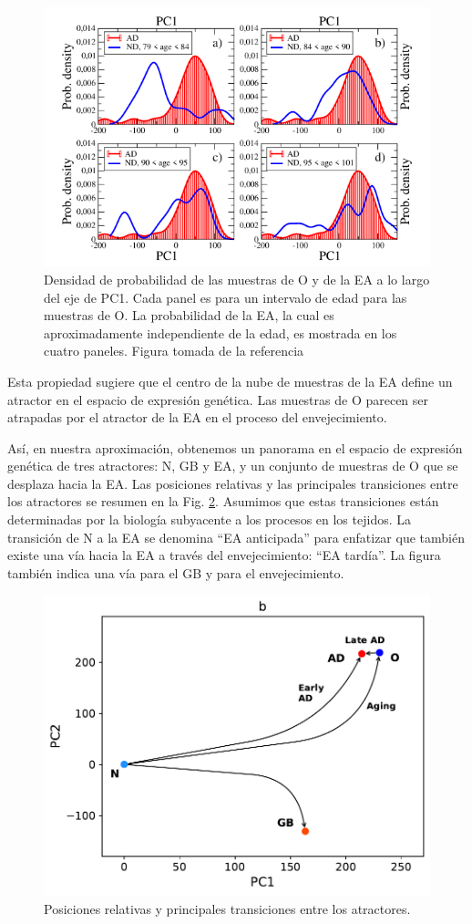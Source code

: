\begin{figure}[!htb]
	\centering
	\includegraphics[width=0.75\linewidth]{figures/suppl_otoad.png}
	\caption{Densidad de probabilidad de las muestras de O y de la EA a lo largo del eje de PC1. Cada panel es para un intervalo de edad para las muestras de O. La probabilidad de la EA, la cual es aproximadamente independiente de la edad, es mostrada en los cuatro paneles. Figura tomada de la referencia \cite{Gonzalez_2021}}
	\label{fig:supplotoad}
\end{figure}

Esta propiedad sugiere que el centro de la nube de muestras de la EA define un atractor en el espacio de expresión genética. Las muestras de O parecen ser atrapadas por el atractor de la EA en el proceso del envejecimiento.

Así, en nuestra aproximación, obtenemos un panorama en el espacio de expresión genética de tres atractores: N, GB y EA, y un conjunto de muestras de O que se desplaza hacia la EA. Las posiciones relativas y las principales transiciones entre los atractores se resumen en la Fig. \ref{fig:fig1b}. Asumimos que estas transiciones están determinadas por la biología subyacente a los procesos en los tejidos. La transición de N a la EA se denomina ``EA anticipada'' para enfatizar que también existe una vía hacia la EA a través del envejecimiento: ``EA tardía''. La figura también indica una vía para el GB y para el envejecimiento.

\begin{figure}[!htb]
	\centering
	\includegraphics[width=0.75\linewidth]{figures/Fig_1b.pdf}
	\caption{Posiciones relativas y principales transiciones entre los atractores.}
	\label{fig:fig1b}
\end{figure}

